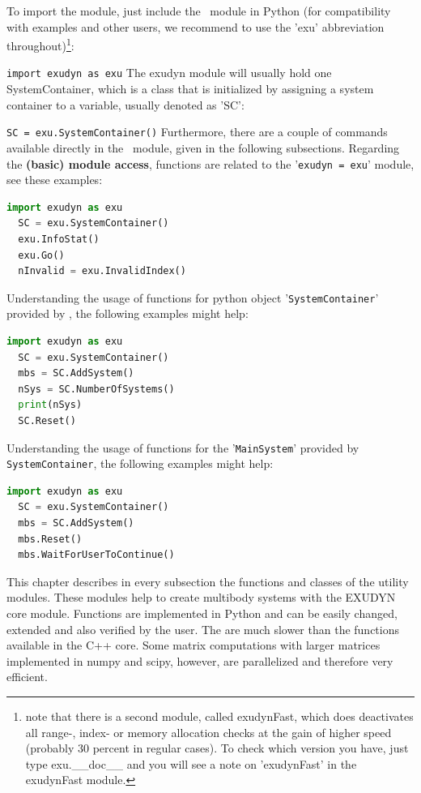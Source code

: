 \documentclass[11pt,a4paper]{book} %
\begin{document}
To import the module, just include the \codeName\ module in Python (for compatibility with examples and other users, we recommend to use the 'exu' abbreviation throughout)\footnote{note that there is a second module, called exudynFast, which does deactivates all range-, index- or memory allocation checks at the gain of higher speed (probably 30 percent in regular cases). To check which version you have, just type exu.\_\_doc\_\_ and you will see a note on 'exudynFast' in the exudynFast module.}:
\bi
  \item[] \texttt{import exudyn as exu}
\ei
The exudyn module will usually hold one SystemContainer, which is a class that is initialized by assigning a system container to a variable, usually denoted as 'SC':
\bi
  \item[] \texttt{SC = exu.SystemContainer()}
\ei
Furthermore, there are a couple of commands available directly in the \codeName\ module, given in the following subsections.
Regarding the {\bf (basic) module access}, functions are related to the '\texttt{exudyn = exu}' module, see these examples:
\begin{lstlisting}[language=Python, firstnumber=14]
  import exudyn as exu
  SC = exu.SystemContainer()
  exu.InfoStat() 
  exu.Go()
  nInvalid = exu.InvalidIndex()
\end{lstlisting} \vspace{12pt}
%
Understanding the usage of functions for python object '\texttt{SystemContainer}' provided by \codeName, the following examples might help:
\begin{lstlisting}[language=Python, firstnumber=14]
  import exudyn as exu
  SC = exu.SystemContainer()
  mbs = SC.AddSystem()
  nSys = SC.NumberOfSystems()
  print(nSys)
  SC.Reset()
\end{lstlisting} \vspace{12pt}
%
Understanding the usage of functions for the '\texttt{MainSystem}' provided by \texttt{SystemContainer}, the following examples might help:
\begin{lstlisting}[language=Python, firstnumber=14]
  import exudyn as exu
  SC = exu.SystemContainer()
  mbs = SC.AddSystem()
  mbs.Reset()
  mbs.WaitForUserToContinue() 
\end{lstlisting} \vspace{12pt}
%



This chapter describes in every subsection the functions and classes of the utility modules. These modules help to create multibody systems with the EXUDYN core module. Functions are implemented in Python and can be easily changed, extended and also verified by the user. The are much slower than the functions available in the C++ core. Some matrix computations with larger matrices implemented in numpy and scipy, however, are parallelized and therefore very efficient.
\end{document}
